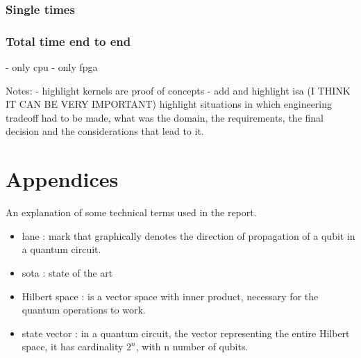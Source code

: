 \documentclass[12pt,oneside,a4paper]{article}
\begin{document}
\subsubsection{Single times}
\subsubsection{Total time end to end}
	- only cpu
	- only fpga

Notes:
	- highlight kernels are proof of concepts
	- add and highlight isa
	(I THINK IT CAN BE VERY IMPORTANT) highlight situations in which engineering tradeoff had to be made, what was the domain, the requirements, the final decision and the considerations that lead to it.






\printbibliography[title={\section{References}}]

\section{Appendices}
An explanation of some technical terms used in the report.
\begin{itemize}
    \item lane : mark that graphically denotes the direction of propagation of a qubit in a quantum circuit.
    \item sota : state of the art
    \item Hilbert space : is a vector space with inner product, necessary for the quantum operations to work.
    \item state vector : in a quantum circuit, the vector representing the entire Hilbert space, it has cardinality $2^n$, with n number of qubits.
\end{itemize}
\end{document}
